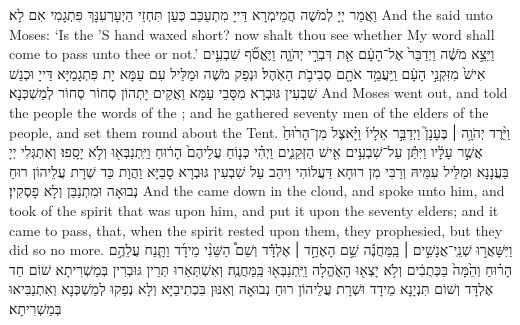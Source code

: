{וַאֲמַר יְיָ לְמֹשֶׁה הֲמֵימְרָא דַּייָ מִתְעַכַּב כְּעַן תִּחְזֵי הַיְעָרְעִנָּךְ פִּתְגָמִי אִם לָא׃}
{And the \lord\space said unto Moses: ‘Is the \lord’S hand waxed short? now shalt thou see whether My word shall come to pass unto thee or not.’}{}
{וַיֵּצֵ֣א מֹשֶׁ֔ה וַיְדַבֵּר֙ אֶל־הָעָ֔ם אֵ֖ת דִּבְרֵ֣י יְהֹוָ֑ה וַיֶּאֱסֹ֞ף שִׁבְעִ֥ים אִישׁ֙ מִזִּקְנֵ֣י הָעָ֔ם וַֽיַּעֲמֵ֥ד אֹתָ֖ם סְבִיבֹ֥ת הָאֹֽהֶל׃}
{וּנְפַק מֹשֶׁה וּמַלֵּיל עִם עַמָּא יָת פִּתְגָמַיָּא דַּייָ וּכְנַשׁ שִׁבְעִין גּוּבְרָא מִסָּבֵי עַמָּא וַאֲקֵים יָתְהוֹן סְחוֹר סְחוֹר לְמַשְׁכְּנָא׃}
{And Moses went out, and told the people the words of the \lord; and he gathered seventy men of the elders of the people, and set them round about the Tent.}{}
{וַיֵּ֨רֶד יְהֹוָ֥ה \small ׀\normalsize  בֶּעָנָן֮ וַיְדַבֵּ֣ר אֵלָיו֒ וַיָּ֗אצֶל מִן־הָר֙וּחַ֙ אֲשֶׁ֣ר עָלָ֔יו וַיִּתֵּ֕ן עַל־שִׁבְעִ֥ים אִ֖ישׁ הַזְּקֵנִ֑ים וַיְהִ֗י כְּנ֤וֹחַ עֲלֵיהֶם֙ הָר֔וּחַ וַיִּֽתְנַבְּא֖וּ וְלֹ֥א יָסָֽפוּ׃
}
{וְאִתְגְּלִי יְיָ בַּעֲנָנָא וּמַלֵּיל עִמֵּיהּ וְרַבִּי מִן רוּחָא דַּעֲלוֹהִי וִיהַב עַל שִׁבְעִין גּוּבְרָא סָבַיָּא וַהֲוָת כַּד שְׁרָת עֲלֵיהוֹן רוּחַ נְבוּאָה וּמִתְנַבַּן וְלָא פָסְקִין׃}
{And the \lord\space came down in the cloud, and spoke unto him, and took of the spirit that was upon him, and put it upon the seventy elders; and it came to pass, that, when the spirit rested upon them, they prophesied, but they did so no more.}{}
{וַיִּשָּׁאֲר֣וּ שְׁנֵֽי־אֲנָשִׁ֣ים \small ׀\normalsize  בַּֽמַּחֲנֶ֡ה שֵׁ֣ם הָאֶחָ֣ד \small ׀\normalsize  אֶלְדָּ֡ד וְשֵׁם֩ הַשֵּׁנִ֨י מֵידָ֜ד וַתָּ֧נַח עֲלֵהֶ֣ם הָר֗וּחַ וְהֵ֙מָּה֙ בַּכְּתֻבִ֔ים וְלֹ֥א יָצְא֖וּ הָאֹ֑הֱלָה וַיִּֽתְנַבְּא֖וּ בַּֽמַּחֲנֶֽה׃
}
{וְאִשְׁתְּאַרוּ תְּרֵין גּוּבְרִין בְּמַשְׁרִיתָא שׁוֹם חַד אֶלְדָּד וְשׁוֹם תִּנְיָנָא מֵידָד וּשְׁרָת עֲלֵיהוֹן רוּחַ נְבוּאָה וְאִנּוּן בִּכְתִיבַיָּא וְלָא נְפַקוּ לְמַשְׁכְּנָא וְאִתְנַבִּיאוּ בְּמַשְׁרִיתָא׃}
